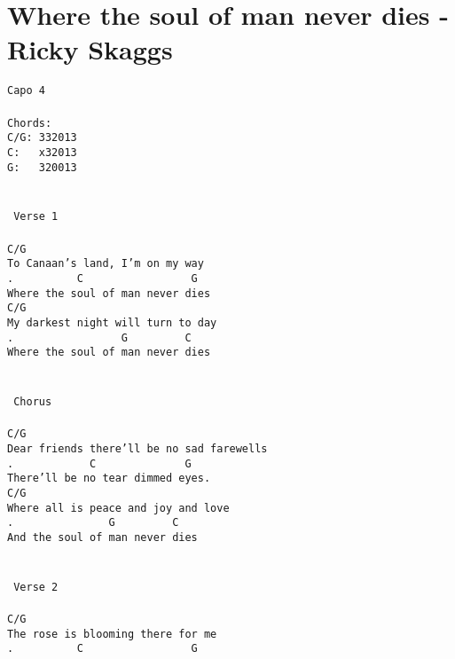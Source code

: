 \newpage
\section{Where the soul of man never dies - Ricky Skaggs}
\label{Where the soul of man never dies - Ricky Skaggs}
\texttt{Capo\ 4\\
\\
Chords:\\
C/G:\ 332013\\
C:\ \ \ x32013\\
G:\ \ \ 320013\\
\\
\\
\lbrack\ Verse\ 1\rbrack\\
\\
C/G\\
To\ Canaan's\ land,\ I'm\ on\ my\ way\\
. \ \ \ \ \ \ \ \ \ C\ \ \ \ \ \ \ \ \ \ \ \ \ \ \ \ \ G\\
Where\ the\ soul\ of\ man\ never\ dies\\
C/G\\
My\ darkest\ night\ will\ turn\ to\ day\\
. \ \ \ \ \ \ \ \ \ \ \ \ \ \ \ \ G\ \ \ \ \ \ \ \ \ C\\
Where\ the\ soul\ of\ man\ never\ dies\\
\\
\\
\lbrack\ Chorus\rbrack\\
\\
C/G\\
Dear\ friends\ there'll\ be\ no\ sad\ farewells\\
. \ \ \ \ \ \ \ \ \ \ \ C\ \ \ \ \ \ \ \ \ \ \ \ \ \ G\\
There'll\ be\ no\ tear\ dimmed\ eyes.\\
C/G\\
Where\ all\ is\ peace\ and\ joy\ and\ love\\
. \ \ \ \ \ \ \ \ \ \ \ \ \ \ G\ \ \ \ \ \ \ \ \ C\\
And\ the\ soul\ of\ man\ never\ dies\\
\\
\\
\lbrack\ Verse\ 2\rbrack\\
\\
C/G\\
The\ rose\ is\ blooming\ there\ for\ me\\
. \ \ \ \ \ \ \ \ \ C\ \ \ \ \ \ \ \ \ \ \ \ \ \ \ \ \ G\\
}
